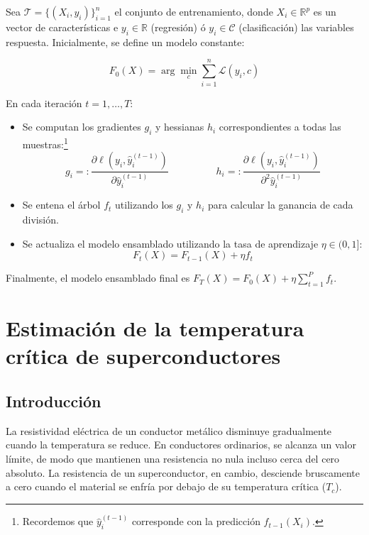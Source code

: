 \documentclass[titlepage, 11pt]{book}
\begin{document}
Sea $\mathcal{T}=\{(X_i,y_i)\}^n_{i=1}$ el conjunto de entrenamiento, donde $X_i \in \mathbb{R}^p$ es un vector de características e $y_i \in \mathbb{R}$ (regresión) ó $y_i \in \mathcal{C}$ (clasificación) las variables respuesta. Inicialmente, se define un modelo constante:

\begin{equation*}
    F_0(X)=\arg\min_{c}\sum^n_{i=1}\mathcal{L}(y_i,c)
\end{equation*}


En cada iteración $t=1, \ldots, T$:
\begin{itemize}
    \item Se computan los gradientes $g_i$ y hessianas $h_i$ correspondientes a todas las muestras:\footnote{Recordemos que $\hat{y}_i^{(t-1)}$ corresponde con la predicción $f_{t-1}(X_i)$.}
    \begin{equation*}
        g_i=:\frac{\partial \ell(y_i,\hat{y}_i^{(t-1)})}{\partial \hat{y}_i^{(t-1)}} \hspace{2cm} h_i=:\frac{\partial \ell(y_i,\hat{y}_i^{(t-1)})}{\partial^2 \hat{y}_i^{(t-1)}}
    \end{equation*}

    \item Se entena el árbol $f_t$ utilizando los $g_i$ y $h_i$ para calcular la ganancia de cada división.

    \item Se actualiza el modelo ensamblado utilizando la tasa de aprendizaje $\eta \in (0,1]$: 
    \begin{equation*}
        F_t(X)=F_{t-1}(X)+\eta f_t
    \end{equation*}
\end{itemize}

Finalmente, el modelo ensamblado final es $F_T(X)=F_0(X)+\eta \sum_{t=1}^P f_t$.


\chapter[Estimacion de $T_c$]{Estimación de la temperatura crítica de superconductores}
\section{Introducción}
La resistividad eléctrica de un conductor metálico disminuye gradualmente cuando la temperatura se reduce. En conductores ordinarios, se alcanza un valor límite, de modo que mantienen una resistencia no nula incluso cerca del cero absoluto. La resistencia de un superconductor, en cambio, desciende bruscamente a cero cuando el material se enfría por debajo de su temperatura crítica ($T_c$).
\end{document}
